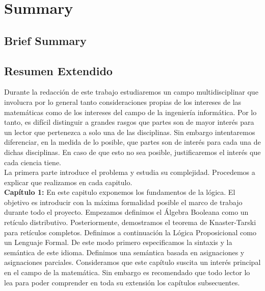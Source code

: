 
\newpage



\chapter*{Summary}
\section*{Brief Summary}



\section*{Resumen Extendido}

Durante la redacción de este trabajo estudiaremos un campo multidisciplinar que involucra por lo general tanto consideraciones propias de los intereses de las matemáticas como de los intereses del campo de la ingeniería informática. Por lo tanto, es difícil distinguir a grandes rasgos que partes son de mayor interés para un lector que pertenezca a solo una de las disciplinas. Sin embargo intentaremos diferenciar, en la medida de lo posible, que partes son de interés para cada una de dichas disciplinas. En caso de que esto no sea posible, justificaremos el interés que cada ciencia tiene.\\

La primera parte introduce el problema y estudia su complejidad. Procedemos a explicar que realizamos en cada capitulo.\\

\textbf{Capítulo 1:} En este capitulo exponemos los fundamentos de la lógica. El objetivo es introducir con la máxima formalidad posible el marco de trabajo durante todo el proyecto. 
Empezamos definimos el Álgebra Booleana como un retículo distributivo. Posteriormente, demostramos el teorema de Knaster-Tarski para retículos completos. Definimos a continuación la Lógica Proposicional como un Lenguaje Formal. De este modo primero especificamos la sintaxis y la semántica de este idioma. Definimos una semántica basada en asignaciones y asignaciones parciales. Consideramos que este capítulo suscita un interés principal en el campo de la matemática. Sin embargo es recomendado que todo lector lo lea para poder comprender en toda su extensión los capítulos subsecuentes.\\

